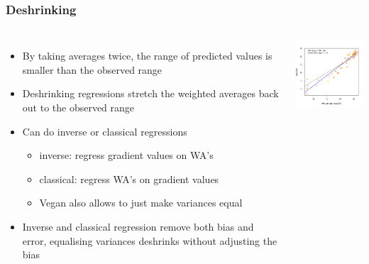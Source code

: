 \documentclass{beamer}
\begin{document}
\begin{frame}
    \frametitle{Deshrinking}
    \begin{columns}
        \column{7.5cm}
        \begin{itemize}
            \item By taking averages twice, the range of predicted values is smaller than the observed range
            \item Deshrinking regressions stretch the weighted averages back out to the observed range
            \item Can do \alert{inverse} or \alert{classical} regressions
            \begin{itemize}
                \item inverse: regress gradient values on WA's
                \item classical: regress WA's on gradient values
                \item Vegan also allows to just make variances equal
            \end{itemize}
            \item Inverse and classical regression remove both bias and error, equalising variances deshrinks without adjusting the bias
        \end{itemize}

        \column{5cm}
        \includegraphics[width=5cm]{deshrinking}
    \end{columns}
\end{frame}
\end{document}

